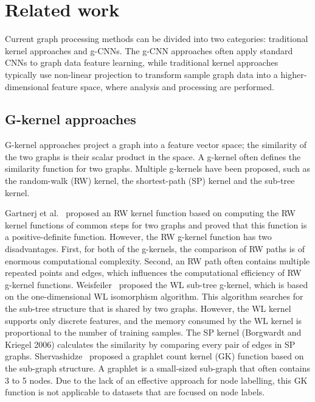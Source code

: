 \documentclass[11pt]{article}
\begin{document}
\section{Related work}
Current graph processing methods can be divided into two categories: traditional kernel approaches and g-CNNs. The g-CNN approaches often apply standard CNNs to graph data feature learning, while traditional kernel approaches typically use non-linear projection to transform sample graph data into a higher-dimensional feature space, where analysis and processing are performed.


\subsection{G-kernel approaches}
G-kernel approaches project a graph into a feature vector space; the similarity of the two graphs is their scalar product in the space. A g-kernel often defines the similarity function for two graphs. Multiple g-kernels have been proposed, such as the random-walk (RW) kernel, the shortest-path (SP) kernel and the sub-tree kernel.

Gartnerj et al.~\cite{G2003On} proposed an RW kernel function based on computing the RW kernel functions of common steps for two graphs and proved that this function is a positive-definite function. However, the RW g-kernel function has two disadvantages. First, for both of the g-kernels, the comparison of RW paths is of enormous computational complexity. Second, an RW path often contains multiple repeated points and edges, which influences the computational efficiency of RW g-kernel functions. Weisfeiler~\cite{WeisfeilerReduction_26}  proposed the WL sub-tree g-kernel, which is based on the one-dimensional WL isomorphism algorithm. This algorithm searches for the sub-tree structure that is shared by two graphs. However, the WL kernel supports only discrete features, and the memory consumed by the WL kernel is proportional to the number of training samples. The SP kernel (Borgwardt and Kriegel 2006) calculates the similarity by comparing every pair of edges in SP graphs. Shervashidze~\cite{Shervashidze2009Efficient_4} proposed a graphlet count kernel (GK) function based on the sub-graph structure. A graphlet is a small-sized sub-graph that often contains 3 to 5 nodes. Due to the lack of an effective approach for node labelling, this GK function is not applicable to datasets that are focused on node labels.
\end{document}
